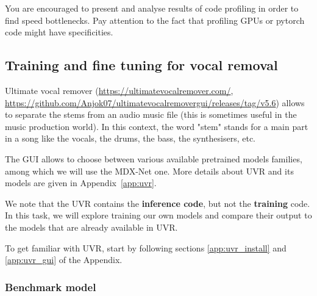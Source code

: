 \documentclass[
10pt, %
a4paper, %
oneside, %
headinclude,footinclude, %
BCOR5mm, %
]{scrartcl}
\begin{document}
You are encouraged to present and analyse results of code profiling in order to find speed bottlenecks. Pay attention to the fact that profiling GPUs or pytorch code might have specificities.

\subsection{Training and fine tuning for vocal removal}%
\label{sub:uvr}

Ultimate vocal remover (\url{https://ultimatevocalremover.com/}, \url{https://github.com/Anjok07/ultimatevocalremovergui/releases/tag/v5.6}) allows to separate the stems from an audio music file (this is sometimes useful in the music production world). In this context, the word "stem" stands for a main part in a song like the vocals, the drums, the bass, the synthesisers, etc.

The GUI allows to choose between various available pretrained models families, among which we will use the MDX-Net one. More details about UVR and its models are given in Appendix~\ref{app:uvr}.

We note that the UVR contains the \textbf{inference code}, but not the \textbf{training} code. In this task, we will explore training our own models and compare their output to the models that are already available in UVR.

To get familiar with UVR, start by following sections \ref{app:uvr_install} and \ref{app:uvr_gui} of the Appendix.

\subsubsection{Benchmark model}%
\label{ssub:benchmark}
\end{document}
